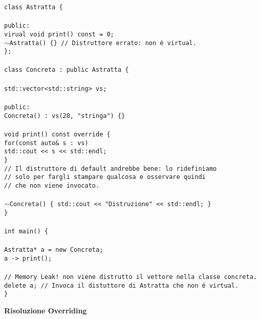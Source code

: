 \documentclass{article}
\newcommand\tab[1][1cm]{\hspace*{#1}}
\newcommand\TILDE{$\sim$}
\begin{document}
\texttt{class Astratta \{ \\ \\ \tab public: \\ \tab \tab virual void print() const = 0; \\ \tab \tab \TILDE Astratta() \{\} \textcolor{grigio}{// Distruttore errato: non \'e virtual.} \\ \}; \\ \\class Concreta : public Astratta \{ \\ \\ \tab std::vector<std::string> vs; \\ \\ \tab public: \\ \tab \tab Concreta() : vs(20, "stringa") \{\} \\ \\ \tab \tab void print() const override \{ \\  \tab \tab \tab for(const auto\& s : vs) \\ \tab \tab \tab \tab std::cout << s << std::endl; \\ \tab \tab \} \\ \tab \tab \textcolor{grigio}{// Il distruttore di default andrebbe bene: lo ridefiniamo \\ \tab \tab // solo per fargli stampare qualcosa e osservare quindi \\ \tab \tab // che non viene invocato.} \\ \\ \tab \tab \TILDE Concreta() \{ std::cout << "Distruzione" << std::endl; \} \\ \} \\ \\ int main() \{ \\ \\ \tab Astratta* a = new Concreta; \\ \tab a -> print(); \\ \\ \tab \textcolor{grigio}{// Memory Leak! non viene distrutto il vettore nella classe concreta.} \\ \tab delete a; \textcolor{grigio}{// Invoca il distuttore di Astratta che non \'e virtual.} \\ \}}
\\
\begin{large}\textbf{\textcolor{blu}{Risoluzione Overriding}} \\ \\ \end{large}
\end{document}
